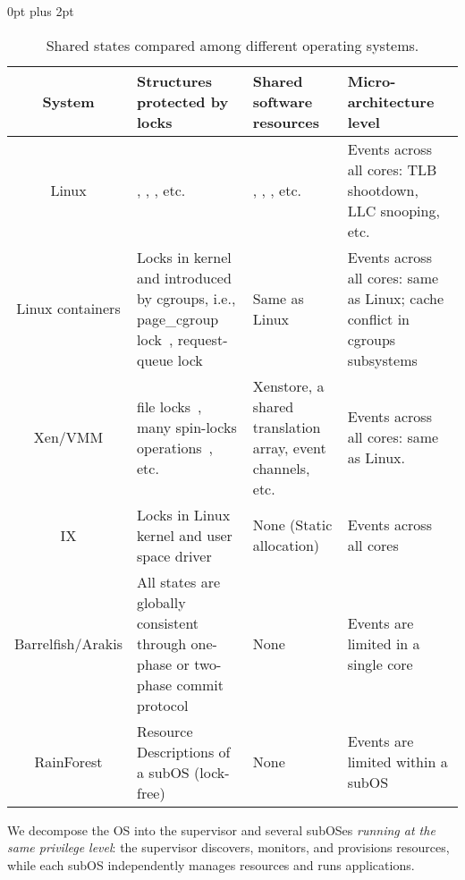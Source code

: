 \documentclass[pageno]{jpaper}
\begin{document}
\begin{table*}[t]
\renewcommand{\arraystretch}{1.1}
\setlength{\abovecaptionskip}{3pt}
\setlength{\belowcaptionskip}{0pt}
\setlength{\textfloatsep} {0pt plus 2pt}
\setlength{\tabcolsep}{5pt}
\centering
\caption{Shared states compared among different operating systems.}
\label{tab_confined_states}
\newsavebox{\tablebox}
\begin{lrbox}{\tablebox}
\begin{tabular}{|c|p{200pt}|p{120pt}|p{160pt}|}
\hline
\textbf{System} & \textbf{Structures protected by locks} & \textbf{Shared software resources} & \textbf{Micro-architecture level}	\\ \hline
Linux & , , , etc.~\cite{Boyd-Wickizer:2010:MOSBench}
		 & , , , etc.~\cite{Boyd-Wickizer:2010:MOSBench}
		 & Events across all cores: TLB shootdown, LLC snooping, etc. \\ \hline
Linux containers &  Locks in kernel and introduced by cgroups, i.e., page\_cgroup lock~\cite{Ahn:2016:IIR}, request-queue lock~\cite{Huang:2016:ESL}
		& Same as Linux
		& Events across all cores: same as Linux; cache conflict in cgroups subsystems\\ \hline
Xen/VMM & file locks~\cite{Nitu:2017:SBQ}, many spin-locks operations~\cite{Zhong:2012:OXH}, etc.
		& Xenstore, a shared translation array, event channels, etc.~\cite{barham2003xen}
		& Events across all cores: same as Linux. \\ \hline
IX &   Locks in Linux kernel and user space driver
		& None (Static allocation)
		& Events across all cores \\ \hline
Barrelfish/Arakis & All states are globally consistent through one-phase or two-phase commit protocol~\cite{Baumann:2009:multikernel}
		& None
		& Events are limited in a single core \\ \hline
RainForest & Resource Descriptions of a subOS (lock-free)
		& None
		& Events are limited within a subOS \\ \hline
\end{tabular}
\end{lrbox}
\scalebox{0.8}{\usebox{\tablebox}}
\end{table*}

We   decompose the OS into the supervisor and several subOSes \emph{running at the same privilege level}: the supervisor discovers, monitors, and provisions resources,  while each  subOS independently manages resources and runs applications.
\end{document}
